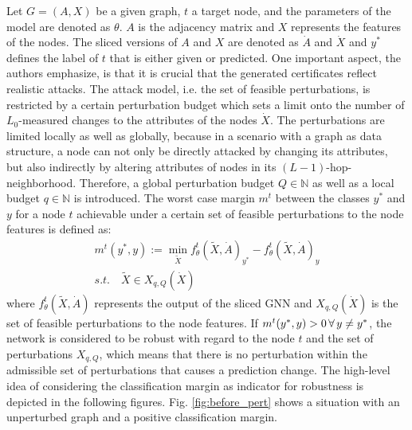 \documentclass[a4paper,preprint]{sig-alternate}
\begin{document}
Let $G = (A, X)$ be a given graph, $t$ a target node, and the parameters of the model are denoted as $\theta$.
$A$ is the adjacency matrix and $X$ represents the features of the nodes. The sliced versions of $A$ and $X$ are denoted 
as $\dot{A}$ and $\dot{X}$ and $y^*$ defines the label of $t$ that is either given or predicted.
One important aspect, the authors emphasize, is that it is crucial that the generated certificates reflect realistic attacks.
The attack model, i.e. the set of feasible perturbations, is restricted by a certain perturbation budget which sets a limit 
onto the number of $L_0$-measured changes to the attributes of the nodes $\dot{X}$.
The perturbations are limited locally as well as globally, because in a scenario with a graph as data structure, a node can not 
only be directly attacked by changing its attributes, but also indirectly by altering attributes of nodes in its 
$(L-1)$-hop-neighborhood. \cite{Zuegner_2019}
Therefore, a global perturbation budget $Q \in \mathbb{N}$ as well as a local budget $q \in \mathbb{N}$ is introduced.
The worst case margin $m^t$ between the classes $y^*$ and $y$ for a node $t$ achievable under a certain set
of feasible perturbations to the node features is defined as:
\begin{gather} 
\label{eq:1}
    m^t (y^*, y) := \min_{\tilde{X}} f_{\theta}^t(\tilde{X}, \dot{A})_{y^*} - f_{\theta}^t(\tilde{X}, \dot{A})_y \\
    s.t. \quad \tilde{X} \in X_{q, Q} (\dot{X}) \nonumber
\end{gather}
where $f_{\theta}^t(\tilde{X}, \dot{A})$ represents the output of the sliced GNN and $X_{q, Q} (\dot{X})$ is the set
of feasible perturbations to the node features.
If $m^t (y^*, y) > 0 \thinspace \forall \thinspace y \neq y^*$, the network is considered to be robust with regard to the node $t$ and the set of
perturbations $X_{q, Q}$, which means that there is no perturbation within the admissible set of perturbations that causes a prediction change. \cite{Zuegner_2019}
The high-level idea of considering the classification margin as indicator for robustness is depicted in the following figures.
Fig. \ref{fig:before_pert} shows a situation with an unperturbed graph and a positive classification margin.

\vfill
\pagebreak
\end{document}
